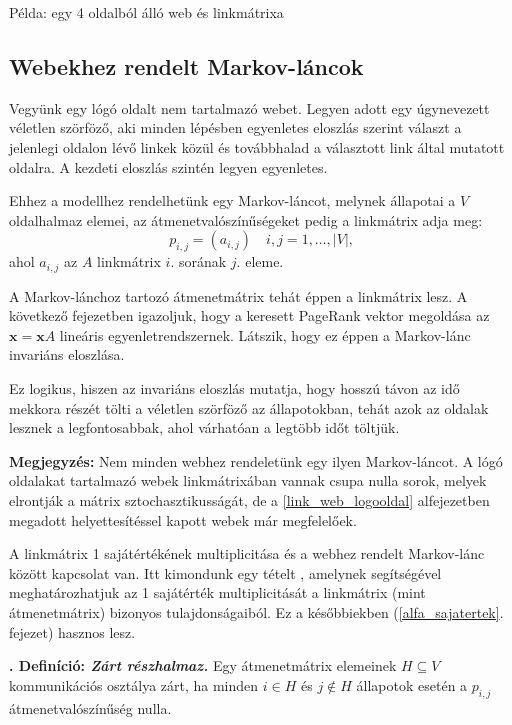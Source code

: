\documentclass[12pt,a4paper]{article}
\newcounter{definicioszam}
\newenvironment{definicio}[1]
{{\medskip}\noindent \stepcounter{definicioszam}
{\bfseries{\thedefinicioszam. Definíció: \textit{#1.}}}}{\bigskip }
\newcommand{\bx}{\mathbf{x}}
\begin{document}
\bigskip
\centerline{Példa: egy 4 oldalból álló web és linkmátrixa}
\bigskip

\subsection{Webekhez rendelt Markov-láncok}\label{markov_lancok}

Vegyünk egy lógó oldalt nem tartalmazó webet. Legyen adott egy úgynevezett véletlen szörföző, aki minden lépésben egyenletes eloszlás szerint választ a jelenlegi oldalon lévő linkek közül és továbbhalad a választott link által mutatott oldalra. A kezdeti eloszlás szintén legyen egyenletes.

Ehhez a modellhez rendelhetünk egy Markov-láncot, melynek állapotai a $V$ oldalhalmaz elemei, az átmenetvalószínűségeket pedig a linkmátrix adja meg:
 \[ p_{i,j} = (a_{i,j}) \quad i,j = 1,\ldots,|V| \text{,} \]
ahol $a_{i,j}$ az $A$ linkmátrix $i$. sorának $j$. eleme.

A Markov-lánchoz tartozó átmenetmátrix tehát éppen a linkmátrix lesz. A következő fejezetben igazoljuk, hogy a keresett PageRank vektor megoldása az $\bx = \bx A$ lineáris egyenletrendszernek. Látszik, hogy ez éppen a Markov-lánc invariáns eloszlása.

Ez logikus, hiszen az invariáns eloszlás mutatja, hogy hosszú távon az idő mekkora részét tölti a véletlen szörföző az állapotokban, tehát azok az oldalak lesznek a legfontosabbak, ahol várhatóan a legtöbb időt töltjük.

\vspace{0.1cm}
\textbf{Megjegyzés:} Nem minden webhez rendeletünk egy ilyen Markov-láncot. A lógó oldalakat tartalmazó webek linkmátrixában vannak csupa nulla sorok, melyek elrontják a mátrix sztochasztikusságát, de a \ref{link_web_logooldal} alfejezetben megadott helyettesítéssel kapott webek már megfelelőek. 
\vspace{0.1cm}

A linkmátrix 1 sajátértékének multiplicitása és a webhez rendelt Markov-lánc között kapcsolat van. Itt kimondunk egy tételt \cite{irreducible_closed}, amelynek segítségével meghatározhatjuk az 1 sajátérték multiplicitását a linkmátrix (mint átmenetmátrix) bizonyos tulajdonságaiból. Ez a későbbiekben (\ref{alfa_sajatertek}. fejezet) hasznos lesz. 

\begin{definicio}{Zárt részhalmaz}
	Egy átmenetmátrix elemeinek $H \subseteq V$ kommunikációs osztálya zárt, ha minden $i \in H$ és $j \notin H$ állapotok esetén a $p_{i,j}$ átmenetvalószínűség nulla.  
\end{definicio}
\end{document}
